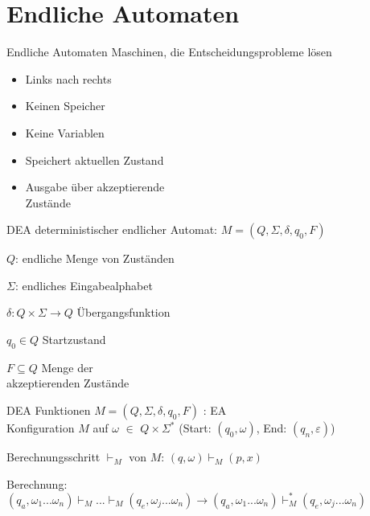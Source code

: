 \section*{Endliche Automaten}

\begin{definition}{Endliche Automaten}
    Maschinen, die Entscheidungsprobleme lösen\\
    \begin{minipage}{0.35\linewidth}
        \begin{itemize}
            \item Links nach rechts
            \item Keinen Speicher
            \item Keine Variablen
        \end{itemize}
    \end{minipage}
    \begin{minipage}{0.5\linewidth}
        \begin{itemize}
            \item Speichert aktuellen Zustand
            \item Ausgabe über akzeptierende\\ Zustände
        \end{itemize}
    \end{minipage}
\end{definition}

\begin{definition}{DEA} deterministischer endlicher Automat: $M=(Q, \Sigma, \delta, q_{0}, F)$

    \begin{minipage}{0.5\linewidth}
        $Q$: endliche Menge von Zuständen

        $\Sigma$: endliches Eingabealphabet

        $\delta: Q \times \Sigma \rightarrow Q$ Übergangsfunktion
    \end{minipage}
    \hspace{1mm}
    \begin{minipage}{0.4\linewidth}
        $q_{0} \in Q$ Startzustand

        $F \subseteq Q$ Menge der\\ akzeptierenden Zustände
    \end{minipage}
\end{definition}

\begin{KR}{DEA Funktionen}
    $M=\left(Q, \Sigma, \delta, q_{0}, F\right)$ : EA\\ 
    Konfiguration $M$ auf $\omega$ $\in$ $Q \times \Sigma^{*}$
    (Start: $(q_{0}, \omega)$, End: $(q_{n}, \varepsilon)$)
    
    Berechnungsschritt $\vdash_{M}$ von $M$:
    $
    (q, \omega) \vdash_{M}(p, x)
    $

    Berechnung: \\{\small $(q_{a}, \omega_{1} ... \omega_{n}) \vdash_{M} ... \vdash_{M}(q_{e}, \omega_{j} ... \omega_{n}) \rightarrow(q_{a}, \omega_{1} ... \omega_{n}) \vdash_{M}^{*}(q_{e}, \omega_{j} ... \omega_{n})$}
   
\end{KR}

